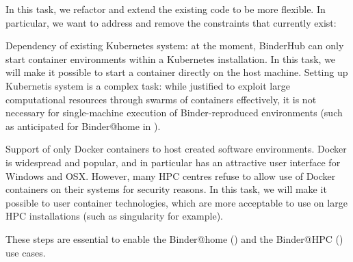 \begin{task}[
  title=Reducing technical constraints to enable broader usage,
  id=constraints,
  lead=SRL,
  PM=14,
  wphases={0-36},
  partners={MP,QS}
]

In this task, we refactor and extend the existing code to be more flexible. In
particular, we want to address and remove the constraints that currently exist:

\begin{compactitem}
\item Dependency of existing Kubernetes system: at the moment, BinderHub can
  only start container environments within a Kubernetes installation. In this
  task, we will make it possible to start a container directly on the host
  machine. Setting up Kubernetis system is a complex task: while justified to
  exploit large computational resources through swarms of containers
  effectively, it is not necessary for single-machine execution of
  Binder-reproduced environments (such as anticipated for Binder@home in
  ).
\item Support of only Docker containers to host created software environments.
  Docker is widespread and popular, and in particular has an attractive user
  interface for Windows and OSX. However, many HPC centres refuse to allow use
  of Docker containers on their systems for security reasons. In this task, we
  will make it possible to user container technologies, which are more
  acceptable to use on large HPC installations (such as singularity for
  example).
  \end{compactitem}

  These steps are essential to enable the Binder@home
  () and the Binder@HPC
  () use cases.

\end{task}
